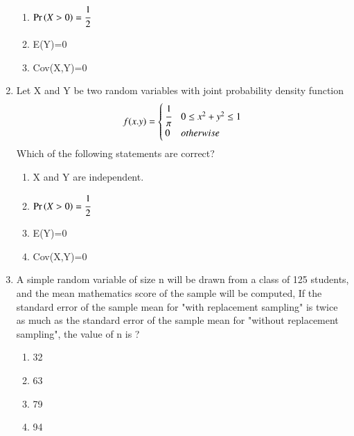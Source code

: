 \begin{enumerate}[label=\thesection.\arabic*.,ref=\thesection.\theenumi]
\begin{enumerate}
    \item
    $\Pr\left(X>0\right)=\cfrac{1}{2}$
    
    \item
    E(Y)=0
    
    \item
    Cov(X,Y)=0
\end{enumerate}
%
%
\solution
%
%
\item Let X and Y be two random variables with joint probability density function
\begin{align*}
    f(x.y)=
    \begin{cases}
    \cfrac{1}{\pi} & 0\le x^2 + y^2 \le 1\\
    0 & otherwise
    \end{cases}
\end{align*}
Which of the following statements are correct?
\begin{enumerate}
    \item
    X and Y are independent.
    
    \item
    $\Pr\left(X>0\right)=\cfrac{1}{2}$
    
    \item
    E(Y)=0
    
    \item
    Cov(X,Y)=0
\end{enumerate}
%
%
\solution

%
\item A simple random variable of size n will be drawn from a class of 125 students, and the mean mathematics score of the sample will be computed, If the standard error of the sample mean for "with replacement sampling" is twice as much as the standard error of the sample mean for "without replacement sampling", the value of n is ? 
	\begin{enumerate}
	\item 32
	\item 63
	\item 79
	\item 94
	\end{enumerate}
%
\solution




\end{enumerate}
